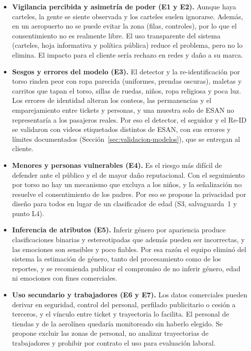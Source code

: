 \documentclass[12pt,a4paper]{article}
\begin{document}
\begin{itemize}
    \item \textbf{Vigilancia percibida y asimetría de poder (E1 y E2).} Aunque
    haya carteles, la gente se siente observada y los carteles suelen
    ignorarse. Además, en un aeropuerto no se puede evitar la zona (filas,
    controles), por lo que el consentimiento no es realmente libre. El uso
    transparente del sistema (carteles, hoja informativa y política pública)
    reduce el problema, pero no lo elimina. El impacto para el cliente sería
    rechazo en redes y daño a su marca.

    \item \textbf{Sesgos y errores del modelo (E3).} El detector y la
    re-identificación por torso rinden peor con ropa parecida (uniformes,
    prendas oscuras), maletas y carritos que tapan el torso, sillas de ruedas,
    niños, ropa religiosa y poca luz. Los errores de identidad alteran los
    conteos, las permanencias y el emparejamiento entre tickets y personas, y
    una muestra solo de ESAN no representaría a los pasajeros reales. Por eso
    el detector, el seguidor y el Re-ID se validaron con videos etiquetados
    distintos de ESAN, con sus errores y límites documentados
    (Sección~\ref{sec:validacion-modelos}), que se entregan al cliente.

    \item \textbf{Menores y personas vulnerables (E4).} Es el riesgo más difícil
    de defender ante el público y el de mayor daño reputacional. Con el
    seguimiento por torso no hay un mecanismo que excluya a los niños, y la
    señalización no resuelve el consentimiento de los padres. Por eso se
    propone la privacidad por diseño para todos en lugar de un clasificador de
    edad (S3, salvaguarda~1 y punto L4).

    \item \textbf{Inferencia de atributos (E5).} Inferir género por apariencia produce clasificaciones binarias y estereotipadas que además pueden ser incorrectas, y las emociones son sensibles y poco fiables. Por esa razón el equipo eliminó del sistema la estimación de género, tanto del procesamiento como de los reportes, y se recomienda publicar el compromiso de no inferir género, edad ni emociones con fines comerciales.

    \item \textbf{Uso secundario y trabajadores (E6 y E7).} Los datos
    comerciales pueden derivar en seguridad, control del personal, perfilado
    publicitario o cesión a terceros, y el vínculo entre ticket y trayectoria lo
    facilita. El personal de tiendas y de la aerolínea quedaría monitoreado sin
    haberlo elegido. Se propone excluir las zonas de personal, no analizar
    trayectorias de trabajadores y prohibir por contrato el uso para evaluación
    laboral.


\end{itemize}
\end{document}
